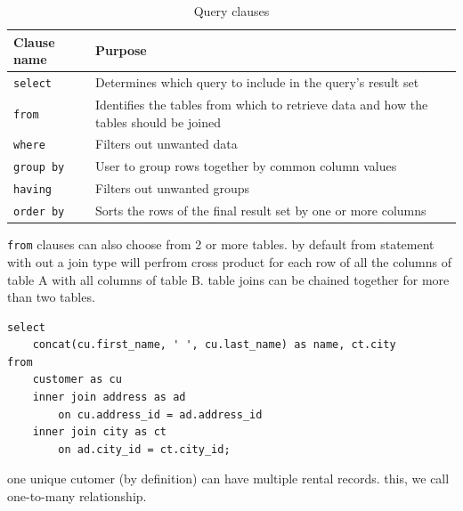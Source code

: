 \documentclass[a4paper]{article}
\begin{document}
\begin{table}[hbt!]\sffamily
    \begin{center}
        \begin{tabularx}{0.75\textwidth}{l X}
            \toprule
            Clause name          & Purpose                                                                               \\
            \midrule
            \lstinline{select}   & Determines which query to include in the query's result set                           \\
            \lstinline{from}     & Identifies the tables from which to retrieve data and how the tables should be joined \\
            \lstinline{where}    & Filters out unwanted data                                                             \\
            \lstinline{group by} & User to group rows together by common column values                                   \\
            \lstinline{having}   & Filters out unwanted groups                                                           \\
            \lstinline{order by} & Sorts the rows of the final result set by one or more columns                         \\
            
            \bottomrule
        \end{tabularx}
        
        \caption{Query clauses}
    \end{center}
\end{table}

\lstinline{from} clauses can also choose from 2 or more tables. by default from statement with out a join type will perfrom cross 
product for each row of all the columns of table A with all columns of table B. table joins can be chained together for more than
two tables.

\begin{lstlisting}
select
    concat(cu.first_name, ' ', cu.last_name) as name, ct.city
from
    customer as cu 
    inner join address as ad 
        on cu.address_id = ad.address_id 
    inner join city as ct 
        on ad.city_id = ct.city_id;
\end{lstlisting}

one unique cutomer (by definition) can have multiple rental records. this, we call one-to-many relationship.
\end{document}
